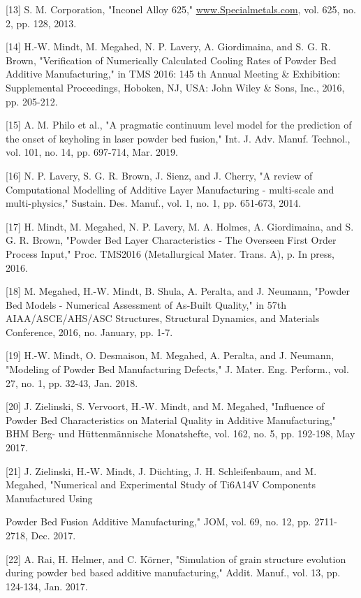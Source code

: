 \documentclass[10pt]{article}
\begin{document}
[13] S. M. Corporation, "Inconel Alloy 625," \href{http://www.Specialmetals.com}{www.Specialmetals.com}, vol. 625, no. 2, pp. 128, 2013.

[14] H.-W. Mindt, M. Megahed, N. P. Lavery, A. Giordimaina, and S. G. R. Brown, "Verification of Numerically Calculated Cooling Rates of Powder Bed Additive Manufacturing," in TMS 2016: 145 th Annual Meeting \& Exhibition: Supplemental Proceedings, Hoboken, NJ, USA: John Wiley \& Sons, Inc., 2016, pp. 205-212.

[15] A. M. Philo et al., "A pragmatic continuum level model for the prediction of the onset of keyholing in laser powder bed fusion," Int. J. Adv. Manuf. Technol., vol. 101, no. 14, pp. 697-714, Mar. 2019.

[16] N. P. Lavery, S. G. R. Brown, J. Sienz, and J. Cherry, "A review of Computational Modelling of Additive Layer Manufacturing - multi-scale and multi-physics," Sustain. Des. Manuf., vol. 1, no. 1, pp. 651-673, 2014.

[17] H. Mindt, M. Megahed, N. P. Lavery, M. A. Holmes, A. Giordimaina, and S. G. R. Brown, "Powder Bed Layer Characteristics - The Overseen First Order Process Input," Proc. TMS2016 (Metallurgical Mater. Trans. A), p. In press, 2016.

[18] M. Megahed, H.-W. Mindt, B. Shula, A. Peralta, and J. Neumann, "Powder Bed Models - Numerical Assessment of As-Built Quality," in 57th AIAA/ASCE/AHS/ASC Structures, Structural Dynamics, and Materials Conference, 2016, no. January, pp. 1-7.

[19] H.-W. Mindt, O. Desmaison, M. Megahed, A. Peralta, and J. Neumann, "Modeling of Powder Bed Manufacturing Defects," J. Mater. Eng. Perform., vol. 27, no. 1, pp. 32-43, Jan. 2018.

[20] J. Zielinski, S. Vervoort, H.-W. Mindt, and M. Megahed, "Influence of Powder Bed Characteristics on Material Quality in Additive Manufacturing," BHM Berg- und Hüttenmännische Monatshefte, vol. 162, no. 5, pp. 192-198, May 2017.

[21] J. Zielinski, H.-W. Mindt, J. Düchting, J. H. Schleifenbaum, and M. Megahed, "Numerical and Experimental Study of Ti6A14V Components Manufactured Using

Powder Bed Fusion Additive Manufacturing," JOM, vol. 69, no. 12, pp. 2711-2718, Dec. 2017.

[22] A. Rai, H. Helmer, and C. Körner, "Simulation of grain structure evolution during powder bed based additive manufacturing," Addit. Manuf., vol. 13, pp. 124-134, Jan. 2017.
\end{document}
